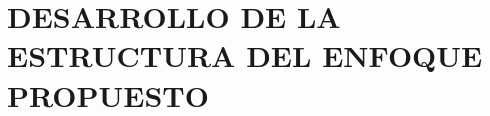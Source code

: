 \documentclass[12pt,oneside,a4paper]{book}
\theoremstyle{definition}
\renewcommand{\chaptermark}[1]{\markboth{\MakeUppercase{#1}}{}}
\begin{document}
\part{DESARROLLO DE LA ESTRUCTURA DEL ENFOQUE PROPUESTO}
  







\renewcommand\bibname{BIBLIOGRAFÍA}
\backmatter \singlespacing   %

\renewcommand{\appendixname}{Anexo}
\renewcommand{\appendixtocname}{ANEXOS}
\renewcommand{\appendixpagename}{ANEXOS}
\renewcommand{\chaptermark}[1]{\markboth{\MakeUppercase{\appendixname\ \thechapter}} {\MakeUppercase{#1}} }
\fancyhead[RE,LO]{}
\appendix
\clearpage
\addappheadtotoc
\appendixpage


\end{document}
